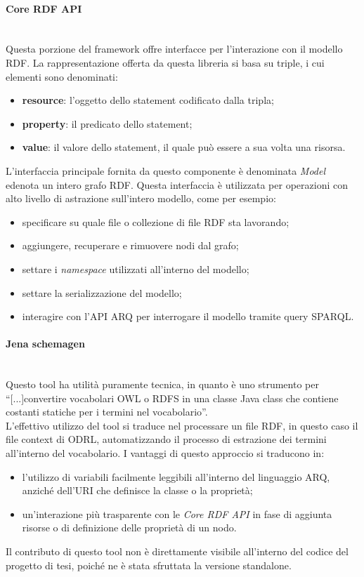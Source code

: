 \documentclass[12pt,a4paper,twoside]{book}
\begin{document}
\paragraph{Core RDF API}\mbox{}\\
Questa porzione del framework offre interfacce per l'interazione con il modello RDF. La rappresentazione offerta da questa libreria si basa su triple, i cui elementi sono denominati:
\begin{itemize}
\item \textbf{resource}: l'oggetto dello statement codificato dalla tripla;
\item \textbf{property}: il predicato dello statement;
\item \textbf{value}: il valore dello statement, il quale può essere a sua volta una risorsa.
\end{itemize}
L'interfaccia principale fornita da questo componente è denominata \textit{Model} edenota un intero grafo RDF. Questa interfaccia è utilizzata per operazioni con alto livello di astrazione sull'intero modello, come per esempio:
\begin{itemize}
\item specificare su quale file o collezione di file RDF sta lavorando;
\item aggiungere, recuperare e rimuovere nodi dal grafo;
\item settare i \textit{namespace} utilizzati all'interno del modello;
\item settare la serializzazione del modello;
\item interagire con l'API ARQ per interrogare il modello tramite query SPARQL.
\end{itemize}
\paragraph{Jena schemagen}\mbox{}\\
Questo tool ha utilità puramente tecnica, in quanto è uno strumento per ``[...]convertire vocabolari OWL o RDFS in una classe Java class che contiene costanti statiche per i termini nel vocabolario''.\\
L'effettivo utilizzo del tool si traduce nel processare un file RDF, in questo caso il file context di ODRL\cite{ODRLContext}, automatizzando il processo di estrazione dei termini all'interno del vocabolario. I vantaggi di questo approccio si traducono in:
\begin{itemize}
\item l'utilizzo di variabili facilmente leggibili all'interno del linguaggio ARQ, anziché dell'URI che definisce la classe o la proprietà;
\item un'interazione più trasparente con le \textit{Core RDF API} in fase di aggiunta risorse o di definizione delle proprietà di un nodo.
\end{itemize}
Il contributo di questo tool non è direttamente visibile all'interno del codice del progetto di tesi, poiché ne è stata sfruttata la versione standalone.
\end{document}
